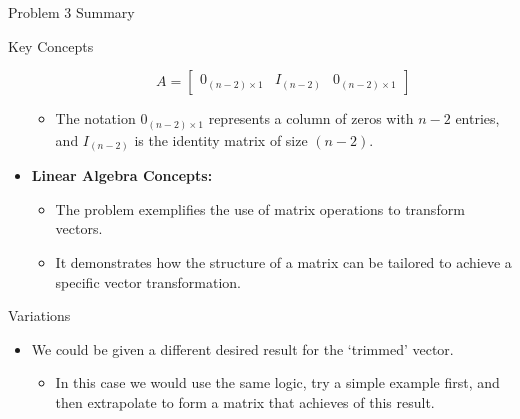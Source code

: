 \begin{summary}{Problem 3 Summary}
\begin{statement}{Key Concepts}
\begin{itemize}
\begin{itemize}
                \begin{equation*}
                    A = 
                    \begin{bmatrix} 
                        0_{(n-2) \times 1} & I_{(n-2)} & 0_{(n-2) \times 1} 
                    \end{bmatrix}
                \end{equation*}
                \item The notation $0_{(n-2) \times 1}$ represents a column of zeros with $n-2$ entries, and $I_{(n-2)}$ is the identity matrix of size $(n-2)$.
            \end{itemize}
            \item \textbf{Linear Algebra Concepts:}
            \begin{itemize}
                \item The problem exemplifies the use of matrix operations to transform vectors.
                \item It demonstrates how the structure of a matrix can be tailored to achieve a specific vector transformation.
            \end{itemize}
        \end{itemize}
    \end{statement}
    \begin{statement}{Variations}
        \begin{itemize}
            \item We could be given a different desired result for the `trimmed' vector.
            \begin{itemize}
                \item In this case we would use the same logic, try a simple example first, and then extrapolate to form a matrix that achieves of this result.
            \end{itemize}
        \end{itemize}
    \end{statement}
\end{summary}

